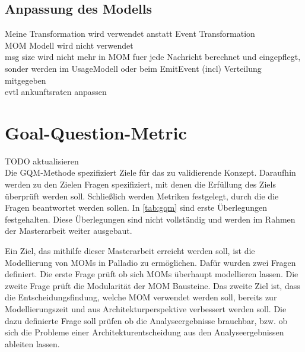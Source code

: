 \subsection{Anpassung des Modells}
Meine Transformation wird verwendet anstatt Event Transformation \\
MOM Modell wird nicht verwendet\\
msg size wird nicht mehr in MOM fuer jede Nachricht berechnet und eingepflegt, sonder werden im UsageModell oder beim EmitEvent (incl) Verteilung mitgegeben \\

evtl ankunftsraten anpassen

\section{Goal-Question-Metric}
TODO aktualisieren \\
Die GQM-Methode \cite{gqm} spezifiziert Ziele für das zu validierende Konzept. Daraufhin werden zu den Zielen Fragen spezifiziert, mit denen die Erfüllung des Ziels überprüft werden soll. Schließlich werden Metriken festgelegt, durch die die Fragen beantwortet werden sollen. In \autoref{tab:gqm} sind erste Überlegungen festgehalten. Diese Überlegungen sind nicht vollständig und werden im Rahmen der Masterarbeit weiter ausgebaut.\par
Ein Ziel, das mithilfe dieser Masterarbeit erreicht werden soll, ist die Modellierung von MOMs in Palladio zu ermöglichen. Dafür wurden zwei Fragen definiert. Die erste Frage prüft ob sich MOMs überhaupt modellieren lassen. Die zweite Frage prüft die Modularität der MOM Bausteine. Das zweite Ziel ist, dass die Entscheidungsfindung, welche MOM verwendet werden soll, bereits zur Modellierungszeit und aus Architekturperspektive verbessert werden soll. Die dazu definierte Frage soll prüfen ob die Analyseergebnisse brauchbar, bzw. ob sich die Probleme einer Architekturentscheidung aus den Analyseergebnissen ableiten lassen. 
